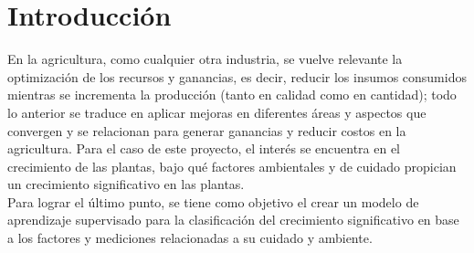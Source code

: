 \documentclass[12pt,a4paper]{article}
\begin{document}
    \tableofcontents
    \newpage

    \section{Introducción}
    {
        En la agricultura, como cualquier otra industria, se vuelve relevante la 
        optimización de los recursos y ganancias, es decir, reducir los insumos 
        consumidos mientras se incrementa la producción (tanto en calidad como en 
        cantidad); todo lo anterior se traduce en aplicar mejoras en diferentes 
        áreas y aspectos que convergen y se relacionan para generar ganancias y 
        reducir costos en la agricultura. Para el caso de este proyecto, el interés 
        se encuentra en el crecimiento de las plantas, bajo qué factores ambientales 
        y de cuidado propician un crecimiento significativo en las plantas.\\ 

        Para lograr el último punto, se tiene como objetivo el crear un modelo de 
        aprendizaje supervisado para la clasificación del crecimiento significativo 
        en base a los factores y mediciones relacionadas a su cuidado y ambiente.\\
    }
    \newpage
\end{document}
